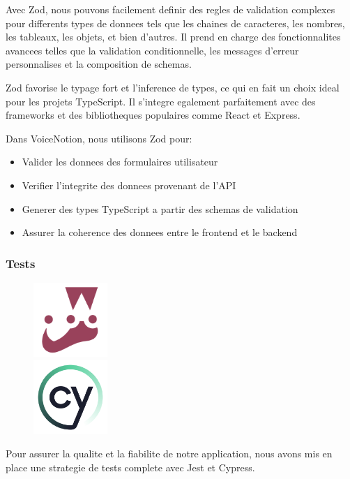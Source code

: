Avec Zod, nous pouvons facilement definir des regles de validation complexes pour differents types de donnees tels que les chaines de caracteres, les nombres, les tableaux, les objets, et bien d'autres. Il prend en charge des fonctionnalites avancees telles que la validation conditionnelle, les messages d'erreur personnalises et la composition de schemas.

Zod favorise le typage fort et l'inference de types, ce qui en fait un choix ideal pour les projets TypeScript. Il s'integre egalement parfaitement avec des frameworks et des bibliotheques populaires comme React et Express. 

Dans VoiceNotion, nous utilisons Zod pour:
\begin{itemize}
    \item Valider les donnees des formulaires utilisateur
    \item Verifier l'integrite des donnees provenant de l'API
    \item Generer des types TypeScript a partir des schemas de validation
    \item Assurer la coherence des donnees entre le frontend et le backend
\end{itemize}

\subsubsection{Tests}
\begin{figure}
    \centering
    \includegraphics[width=0.25\textwidth]{assets/docs/jest.png}\\
    \vspace{0.5cm}
    \includegraphics[width=0.25\textwidth]{assets/docs/cypress.png}
\end{figure}
Pour assurer la qualite et la fiabilite de notre application, nous avons mis en place une strategie de tests complete avec Jest et Cypress.

